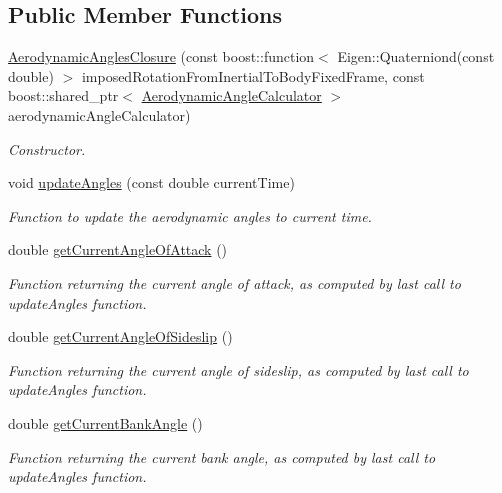 \subsection*{Public Member Functions}
\begin{DoxyCompactItemize}
\item 
\hyperlink{classtudat_1_1reference__frames_1_1AerodynamicAnglesClosure_ac6094c0234aae8361d870cadd473a4e9}{Aerodynamic\+Angles\+Closure} (const boost\+::function$<$ Eigen\+::\+Quaterniond(const double) $>$ imposed\+Rotation\+From\+Inertial\+To\+Body\+Fixed\+Frame, const boost\+::shared\+\_\+ptr$<$ \hyperlink{classtudat_1_1reference__frames_1_1AerodynamicAngleCalculator}{Aerodynamic\+Angle\+Calculator} $>$ aerodynamic\+Angle\+Calculator)
\begin{DoxyCompactList}\small\item\em Constructor. \end{DoxyCompactList}\item 
void \hyperlink{classtudat_1_1reference__frames_1_1AerodynamicAnglesClosure_a13b61fac96891ecfc1d110fa5da766b6}{update\+Angles} (const double current\+Time)
\begin{DoxyCompactList}\small\item\em Function to update the aerodynamic angles to current time. \end{DoxyCompactList}\item 
double \hyperlink{classtudat_1_1reference__frames_1_1AerodynamicAnglesClosure_ad1c53bafd93abbf1af68fa4b6820b79b}{get\+Current\+Angle\+Of\+Attack} ()
\begin{DoxyCompactList}\small\item\em Function returning the current angle of attack, as computed by last call to update\+Angles function. \end{DoxyCompactList}\item 
double \hyperlink{classtudat_1_1reference__frames_1_1AerodynamicAnglesClosure_ab4bda7326cae04af7409691730a3661f}{get\+Current\+Angle\+Of\+Sideslip} ()
\begin{DoxyCompactList}\small\item\em Function returning the current angle of sideslip, as computed by last call to update\+Angles function. \end{DoxyCompactList}\item 
double \hyperlink{classtudat_1_1reference__frames_1_1AerodynamicAnglesClosure_a2eb0592f448aed14dcc3dc132aedba32}{get\+Current\+Bank\+Angle} ()
\begin{DoxyCompactList}\small\item\em Function returning the current bank angle, as computed by last call to update\+Angles function. \end{DoxyCompactList}\end{DoxyCompactItemize}



